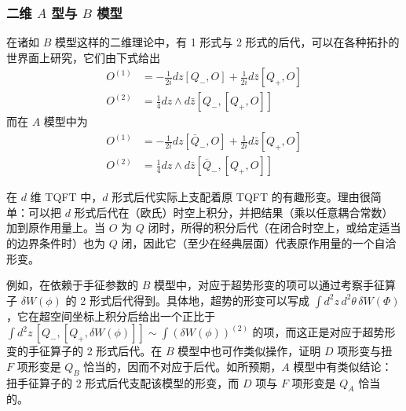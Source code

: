 \subsubsection{二维 $A$ 型与 $B$ 模型}

在诸如 $B$ 模型这样的二维理论中，有 1 形式与 2 形式的后代，可以在各种拓扑的世界面上研究，它们由下式给出
\begin{equation}\tag{3.6}
\begin{aligned}
O^{(1)} &= -\frac{1}{2i}dz[Q_-,O] + \frac{1}{2i}d\bar z[Q_+,O]\\
O^{(2)} &= \frac{1}{4}dz\wedge d\bar z[Q_-,[Q_+,O]]
\end{aligned}
\end{equation}
而在 $A$ 模型中为
\begin{equation}\tag{3.7}
\begin{aligned}
O^{(1)} &= -\frac{1}{2i}dz[\bar Q_-,O] + \frac{1}{2i}d\bar z[Q_+,O]\\
O^{(2)} &= \frac{1}{4}dz\wedge d\bar z[\bar Q_-,[Q_+,O]]
\end{aligned}
\end{equation}

在 $d$ 维 TQFT 中，$d$ 形式后代实际上支配着原 TQFT 的有趣形变。理由很简单：可以把 $d$ 形式后代在（欧氏）时空上积分，并把结果（乘以任意耦合常数）加到原作用量上。当 $O$ 为 $Q$ 闭时，所得的积分后代（在闭合时空上，或给定适当的边界条件时）也为 $Q$ 闭，因此它（至少在经典层面）代表原作用量的一个自洽形变。

例如，在依赖于手征参数的 $B$ 模型中，对应于超势形变的项可以通过考察手征算子 $\delta W(\phi)$ 的 2 形式后代得到。具体地，超势的形变可以写成 $\int d^2z\,d^2\theta\,\delta W(\Phi)$，它在超空间坐标上积分后给出一个正比于 $\int d^2z\,[Q_-,[Q_+,\delta W(\phi)]] \sim \int (\delta W(\phi))^{(2)}$ 的项，而这正是对应于超势形变的手征算子的 2 形式后代。在 $B$ 模型中也可作类似操作，证明 $D$ 项形变与扭 $F$ 项形变是 $Q_B$ 恰当的，因而不对应于后代。如所预期，$A$ 模型中有类似结论：扭手征算子的 2 形式后代支配该模型的形变，而 $D$ 项与 $F$ 项形变是 $Q_A$ 恰当的。

